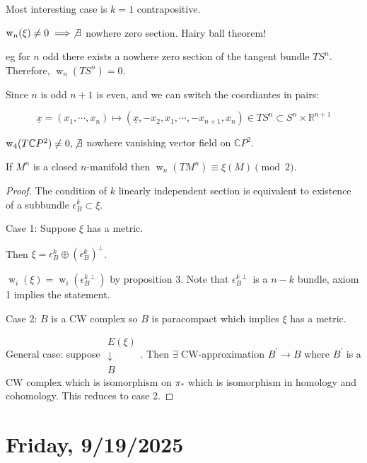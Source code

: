 \documentclass{article}
\theoremstyle{definition}
\begin{document}
    Most interesting case is \(k = 1\) contrapositive.

    \(\operatorname{w}_n(\xi) \neq 0 \implies \not\exists\) nowhere zero section. Hairy ball theorem!

    eg for \(n\) odd there exists a nowhere zero section of the tangent bundle \(TS^n\). Therefore, \(\operatorname{w}_n(TS^n) = 0\).
    
    Since \(n\) is odd \(n+1\) is even, and we can switch the coordiantes in pairs:

    \[
        \underline{x} = (x_1, \cdots , x_n) \mapsto (\underline{x}, -x_2, x_1, \cdots ,-x_{n+1}, x_n) \in TS^n \subset S^n \times \mathbb{R}^{n+1} 
    \]

    \(\operatorname{w}_4(T \mathbb{C} P^2)\neq 0, \not\exists\) nowhere vanishing vector field on \(\mathbb{C}P^2\).

    If \(M^n\) is a closed \(n\)-manifold then \(\operatorname{w}_n(TM^n) \equiv \xi(M) \pmod 2\).

    \begin{proof}
        The condition of \(k\) linearly independent section is equivalent to existence of a subbundle \(\epsilon^k_B \subset \xi\).

        Case 1: Suppose \(\xi\) has a metric.

        Then \(\xi = \epsilon^k_B \oplus (\epsilon^k_B)^{\perp}\). 

        \(\operatorname{w}_i(\xi) = \operatorname{w}_i(\epsilon^{k \perp}_B)\) by proposition 3. Note that \(\epsilon^{k \perp}_B\) is a \(n - k\) bundle, axiom 1 implies the statement.

        Case 2: \(B\) is a CW complex so \(B\) is paracompact which implies \(\xi\) has a metric.

        General case: suppose \(\begin{matrix} E(\xi) \\ \downarrow \\ B \end{matrix}\). Then \(\exists\) CW-approximation \(B^{\prime} \to B\) where \(B^{\prime}\) is a CW complex which is isomorphism on \(\pi_{\ast}\) which is isomorphism in homology and cohomology. This reduces to case 2.

    \end{proof} 

    \section*{Friday, 9/19/2025}
    
\end{document}
